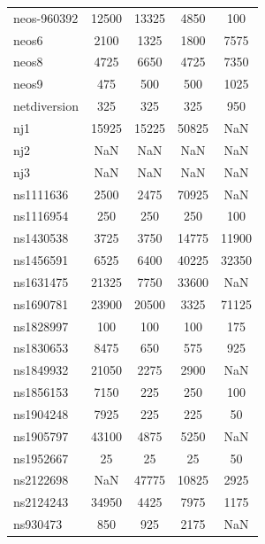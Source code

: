 \begin{longtable}{lcccc}
neos-960392                 &    12500 &    13325 &     4850 &   100 \\
neos6                       &     2100 &     1325 &     1800 &  7575 \\
neos8                       &     4725 &     6650 &     4725 &  7350 \\
neos9                       &      475 &      500 &      500 &  1025 \\
netdiversion                &      325 &      325 &      325 &   950 \\
nj1                         &    15925 &    15225 &    50825 &   NaN \\
nj2                         &      NaN &      NaN &      NaN &   NaN \\
nj3                         &      NaN &      NaN &      NaN &   NaN \\
ns1111636                   &     2500 &     2475 &    70925 &   NaN \\
ns1116954                   &      250 &      250 &      250 &   100 \\
ns1430538                   &     3725 &     3750 &    14775 & 11900 \\
ns1456591                   &     6525 &     6400 &    40225 & 32350 \\
ns1631475                   &    21325 &     7750 &    33600 &   NaN \\
ns1690781                   &    23900 &    20500 &     3325 & 71125 \\
ns1828997                   &      100 &      100 &      100 &   175 \\
ns1830653                   &     8475 &      650 &      575 &   925 \\
ns1849932                   &    21050 &     2275 &     2900 &   NaN \\
ns1856153                   &     7150 &      225 &      250 &   100 \\
ns1904248                   &     7925 &      225 &      225 &    50 \\
ns1905797                   &    43100 &     4875 &     5250 &   NaN \\
ns1952667                   &       25 &       25 &       25 &    50 \\
ns2122698                   &      NaN &    47775 &    10825 &  2925 \\
ns2124243                   &    34950 &     4425 &     7975 &  1175 \\
ns930473                    &      850 &      925 &     2175 &   NaN \\

\end{longtable}
